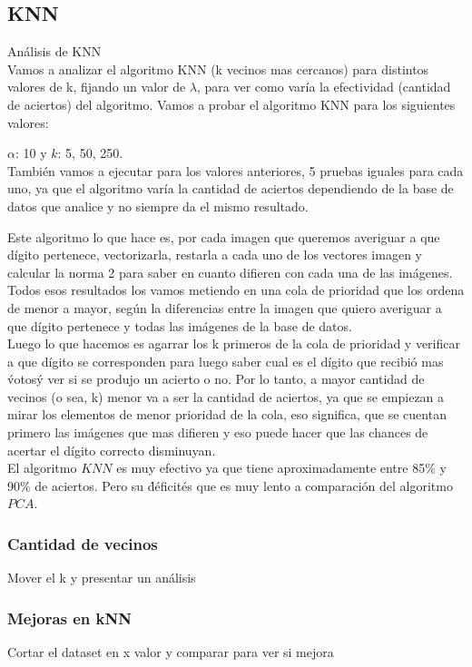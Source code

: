 \subsection{KNN}
Análisis de KNN
\\
Vamos a analizar el algoritmo KNN (k vecinos mas cercanos) para distintos valores de k, fijando un valor de $\lambda$, para ver como varía la efectividad (cantidad de aciertos) del algoritmo.
Vamos a probar el algoritmo KNN para los siguientes valores:

$\alpha$: 10  y $k$: 5, 50, 250.\\

También vamos a ejecutar para los valores anteriores, 5 pruebas iguales para cada uno, ya que el algoritmo varía la cantidad de aciertos dependiendo de la base de datos que analice y no siempre da el mismo resultado.

Este algoritmo lo que hace es, por cada imagen que queremos averiguar a que dígito pertenece, vectorizarla, restarla a cada uno de los vectores imagen y calcular la norma 2 para saber en cuanto difieren con cada una de las imágenes.
Todos esos resultados los vamos metiendo en una cola de prioridad que los ordena de menor a mayor, según la diferencias entre la imagen que quiero averiguar a que dígito pertenece y todas las imágenes de la base de datos.
\\
Luego lo que hacemos es agarrar los k primeros de la cola de prioridad y verificar a que dígito se corresponden para luego saber cual es el dígito que recibió mas \'votos\' y ver si se produjo un acierto o no.
Por lo tanto, a mayor cantidad de vecinos (o sea, k) menor va a ser la cantidad de aciertos, ya que se empiezan a mirar los elementos de menor prioridad de la cola, eso significa, que se cuentan primero las imágenes que mas difieren y eso puede hacer que las chances de acertar el dígito correcto disminuyan.
\\
El algoritmo $KNN$ es muy efectivo ya que tiene aproximadamente entre 85\% y 90\% de aciertos. Pero su \'déficit\' es que es muy lento a comparación del algoritmo $PCA$. 

\subsubsection{Cantidad de vecinos}
Mover el k y presentar un análisis

\subsubsection{Mejoras en kNN}
Cortar el dataset en x valor y comparar para ver si mejora

